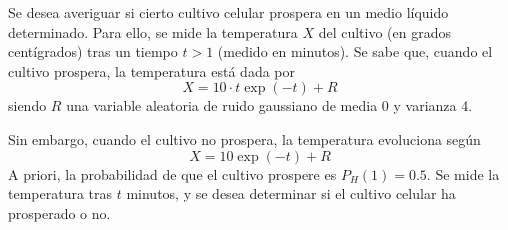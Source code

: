 \ifspanish

\question[25] %

Se desea averiguar si cierto cultivo celular prospera en un medio líquido determinado. Para ello, se mide la temperatura $X$ del cultivo (en grados centígrados) tras un tiempo $t > 1$ (medido en minutos). Se sabe que, cuando el cultivo prospera, la temperatura está dada por
$$ X = 10 \cdot  t \exp(-t) + R$$
siendo $R$ una variable aleatoria de ruido gaussiano de media 0 y varianza 4.

Sin embargo, cuando el cultivo  no prospera, la temperatura evoluciona según
$$ X = 10 \exp(-t) + R$$
A priori, la probabilidad de que el cultivo prospere es $P_H(1) = 0.5$. Se mide la temperatura tras $t$ minutos, y se desea determinar si el cultivo celular ha prosperado o no.

